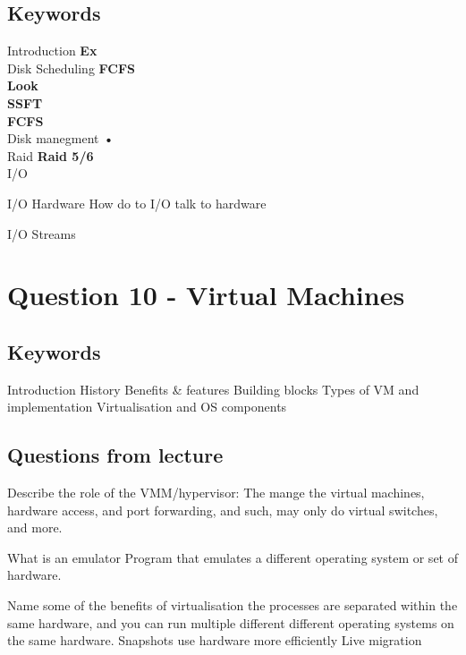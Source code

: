 \documentclass[a4paper,10pt,titlepage]{report}
\begin{document}
\subsection{Keywords}
Introduction
\hspace{10mm} \textbf{Ex} \\
Disk Scheduling 
\hspace{15mm} \textbf{FCFS} \\
\hspace{15mm} \textbf{Look} \\
\hspace{15mm} \textbf{SSFT} \\
\hspace{15mm} \textbf{FCFS} \\



Disk manegment 
\hspace{5mm} \textbf{•} \\


Raid
\hspace{5mm} \textbf{Raid 5/6} \\

I/O

I/O Hardware
	How do to I/O talk to hardware

I/O Streams
	

\section{Question 10 - Virtual Machines }



\subsection{Keywords}
Introduction
History
Benefits \& features
Building blocks
Types of VM and implementation
Virtualisation and OS components 


\subsection{Questions from lecture}
Describe the role of the VMM/hypervisor:
	The mange the virtual machines, hardware access, and port forwarding, and such, may only do virtual switches, and more.

	


What is an emulator
	Program that emulates a different operating system or set of hardware.


Name some of the benefits of virtualisation
	the processes are separated within the same hardware, and you can run multiple different different operating systems on the same hardware.
		Snapshots
	use hardware more efficiently
	Live migration
\end{document}
